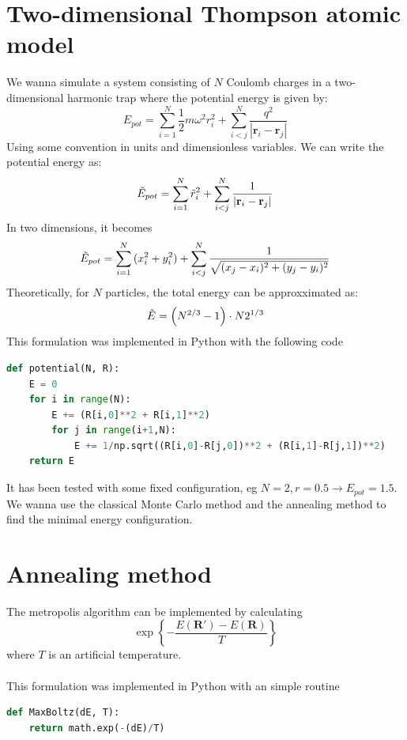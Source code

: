 \documentclass{article}
\begin{document}
\section{Two-dimensional Thompson atomic model}
We wanna simulate a system consisting of $N$ Coulomb charges in a two-dimensional harmonic trap where the potential energy is given by:
\begin{equation}
    E_{pot}=\sum_{i=1}^N{\frac12m\omega^2r_i^2+\sum_{i<j}^N{\frac{q^2}{\left|\mathbf{r}_i-\mathbf{r}_j\right|}}}
\end{equation}
Using some convention in units and dimensionless variables. We can write the potential energy as:
\begin{equation}
    \Tilde{E}_{pot}=\sum_{i=1}^N{\tilde{r}_i^2+\sum_{i<j}^N{\frac{1}{\left|\mathbf{r}_i-\mathbf{r}_j\right|}}}
\end{equation}
In two dimensions, it becomes
\begin{equation}
    \Tilde{E}_{pot}=\sum_{i=1}^N{(x_i^2+y_i^2)+\sum_{i<j}^N{\frac{1}{\sqrt{(x_j-x_i)^2+(y_j-y_i)^2}}}}
\end{equation}
Theoretically, for $N$ particles, the total energy can be approxximated as:
\begin{equation}
    \Tilde{E}=\left(N^{2/3}-1\right)\cdot N2^{1/3}
\end{equation}
This formulation was implemented in Python with the following code
\begin{lstlisting}[language=Python]
def potential(N, R):
    E = 0
    for i in range(N):
        E += (R[i,0]**2 + R[i,1]**2)
        for j in range(i+1,N):
            E += 1/np.sqrt((R[i,0]-R[j,0])**2 + (R[i,1]-R[j,1])**2)
    return E
\end{lstlisting}
It has been tested with some fixed configuration, eg $N=2,r=0.5\rightarrow E_{pot}=1.5$.\\
We wanna use the classical Monte Carlo method and the annealing method to find the minimal energy configuration.
\section{Annealing method}
The metropolis algorithm can be implemented by calculating
\begin{equation}
    \exp{\left\{-\frac{E(\mathbf{R}')-E(\mathbf{R})}{T}\right\}}
\end{equation}
where $T$ is an artificial temperature.\\\\
This formulation was implemented in Python with an simple routine
\begin{lstlisting}[language=Python]
def MaxBoltz(dE, T):
    return math.exp(-(dE)/T)
\end{lstlisting}
\end{document}
